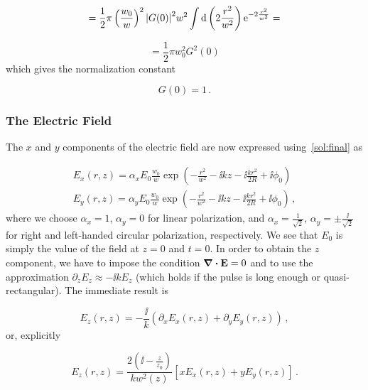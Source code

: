 \documentclass[12pt, class=report, crop=false]{standalone}
\begin{document}
\begin{equation*}
  = \frac{1}{2}\pi \left(\frac{w_0}{w}\right)^2 \abs{G(0)}^2 w^2\int \dd{\left(2\frac{r^2}{w^2}\right)} \operatorname{e}^{-2\frac{r^2}{w^2}} =
\end{equation*}

\begin{equation*}
  = \frac{1}{2}\pi w_0^2 G^2(0)
\end{equation*}
which gives the normalization constant

\begin{equation}
  G(0) = 1\,.
\end{equation}

\subsubsection{The Electric Field}
The \(x\) and \(y\) components of the electric field are now expressed using~\cref{sol:final} as

\begin{subequations}
  \label{def:gauss-beam-fields-xy}
  \begin{align}
    E_x (r,z) = \alpha_x E_0 \frac{w_0}{w} \exp(-\frac{r^2}{w^2}  -\ii k z -\ii \frac{k r^2}{2 R} + \ii \phi_0)\\
    E_y (r,z) = \alpha_y E_0 \frac{w_0}{w} \exp(-\frac{r^2}{w^2}  -\ii k z -\ii \frac{k r^2}{2 R} + \ii \phi_0)\,,
  \end{align}
\end{subequations}
where we choose \(\alpha_x=1\), \(\alpha_y=0\) for linear polarization, and \(\alpha_x=\frac{1}{\sqrt{2}}\), \(\alpha_y=\pm \frac{\ii}{\sqrt{2}}\) for right and left-handed circular polarization, respectively. We see that \(E_0\) is simply the value of the field at \(z=0\) and \(t=0\). In order to obtain the \(z\) component, we have to impose the condition \(\div{\vb{E}} = 0\) and to use the approximation \(\partial_z E_z \approx -\ii k E_z\) (which holds if the pulse is long enough or quasi-rectangular). The immediate result is

\begin{equation}
  E_z (r,z) = - \frac{\ii}{k} \left( \partial_x E_x (r,z) +\partial_y E_y (r,z)\right)\,,
\end{equation}
or, explicitly

\begin{equation}
  E_z (r,z) = \frac{2 \left(\ii -\frac{z}{z_0}\right)}{kw^2 (z)} [xE_x (r,z) +yE_y(r,z)]\,.
\end{equation}
\end{document}
